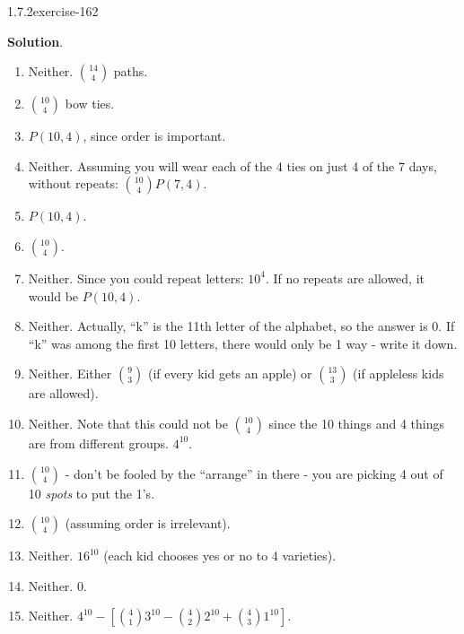 \documentclass[twoside,11pt,]{book}
\numberwithin{equation}{chapter}
\begin{document}
\begin{divisionsolution}{1.7.2}{}{exercise-162}
\begin{enumerate}[label=(\alph*)]
\end{enumerate}
%
\par\smallskip%
\noindent\textbf{Solution}.\quad%
\hypertarget{p-2653}{}%
\leavevmode%
\begin{enumerate}[label=(\alph*)]
\item\hypertarget{li-1566}{}\hypertarget{p-2654}{}%
Neither. \({14 \choose 4}\) paths.%
\item\hypertarget{li-1567}{}\({10\choose 4}\) bow ties.%
\item\hypertarget{li-1568}{}\(P(10,4)\), since order is important.%
\item\hypertarget{li-1569}{}\hypertarget{p-2655}{}%
Neither. Assuming you will wear each of the 4 ties on just 4 of the 7 days, without repeats: \({10\choose 4}P(7,4)\).%
\item\hypertarget{li-1570}{}\(P(10,4)\).%
\item\hypertarget{li-1571}{}\({10\choose 4}\).%
\item\hypertarget{li-1572}{}\hypertarget{p-2656}{}%
Neither. Since you could repeat letters: \(10^4\). If no repeats are allowed, it would be \(P(10,4)\).%
\item\hypertarget{li-1573}{}\hypertarget{p-2657}{}%
Neither. Actually, ``k'' is the 11th letter of the alphabet, so the answer is 0. If ``k'' was among the first 10 letters, there would only be 1 way - write it down.%
\item\hypertarget{li-1574}{}\hypertarget{p-2658}{}%
Neither. Either \({9\choose 3}\) (if every kid gets an apple) or \({13 \choose 3}\) (if appleless kids are allowed).%
\item\hypertarget{li-1575}{}\hypertarget{p-2659}{}%
Neither. Note that this could not be \({10 \choose 4}\) since the 10 things and 4 things are from different groups. \(4^{10}\).%
\item\hypertarget{li-1576}{}\({10 \choose 4}\) - don't be fooled by the ``arrange'' in there - you are picking 4 out of 10 \emph{spots} to put the 1's.%
\item\hypertarget{li-1577}{}\({10 \choose 4}\) (assuming order is irrelevant).%
\item\hypertarget{li-1578}{}\hypertarget{p-2660}{}%
Neither. \(16^{10}\) (each kid chooses yes or no to 4 varieties).%
\item\hypertarget{li-1579}{}\hypertarget{p-2661}{}%
Neither. 0.%
\item\hypertarget{li-1580}{}\hypertarget{p-2662}{}%
Neither. \(4^{10} - [{4\choose 1}3^{10} - {4\choose 2}2^{10} + {4 \choose 3}1^{10}]\).%

\end{enumerate}
\end{divisionsolution}
\end{document}
